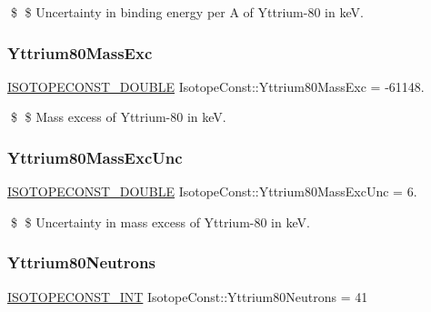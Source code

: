 \$ \$ Uncertainty in binding energy per A of Yttrium-\/80 in keV. \mbox{\label{group___isotope_const-_yttrium-_y80_gab3d73a8ded614dbc182e3bddb8b9ed02}} 
\subsubsection{\texorpdfstring{Yttrium80\+Mass\+Exc}{Yttrium80MassExc}}
{\footnotesize\ttfamily \mbox{\hyperlink{group___isotope_const-_macros_ga8f45a7272ce02c0b4c65c44636ed719a}{I\+S\+O\+T\+O\+P\+E\+C\+O\+N\+S\+T\+\_\+\+D\+O\+U\+B\+LE}} Isotope\+Const\+::\+Yttrium80\+Mass\+Exc = -\/61148.}

\$ \$ Mass excess of Yttrium-\/80 in keV. \mbox{\label{group___isotope_const-_yttrium-_y80_ga5ce03f6b0ca55399b52eeee460dc6d7f}} 
\subsubsection{\texorpdfstring{Yttrium80\+Mass\+Exc\+Unc}{Yttrium80MassExcUnc}}
{\footnotesize\ttfamily \mbox{\hyperlink{group___isotope_const-_macros_ga8f45a7272ce02c0b4c65c44636ed719a}{I\+S\+O\+T\+O\+P\+E\+C\+O\+N\+S\+T\+\_\+\+D\+O\+U\+B\+LE}} Isotope\+Const\+::\+Yttrium80\+Mass\+Exc\+Unc = 6.}

\$ \$ Uncertainty in mass excess of Yttrium-\/80 in keV. \mbox{\label{group___isotope_const-_yttrium-_y80_ga3325c1091bcb48bfdb8569aaf56183f7}} 
\subsubsection{\texorpdfstring{Yttrium80\+Neutrons}{Yttrium80Neutrons}}
{\footnotesize\ttfamily \mbox{\hyperlink{group___isotope_const-_macros_ga5f18360b3e99483a35c32d789e62621c}{I\+S\+O\+T\+O\+P\+E\+C\+O\+N\+S\+T\+\_\+\+I\+NT}} Isotope\+Const\+::\+Yttrium80\+Neutrons = 41}

